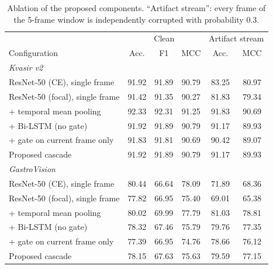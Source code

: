 \begin{table}[t]
\caption{Ablation of the proposed components. ``Artifact stream'': every frame of the 5-frame window is
independently corrupted with probability 0.3.}
\label{tab:ablation}\centering\setlength{\tabcolsep}{3pt}
\begin{tabular}{lccccc}\toprule
 & \multicolumn{3}{c}{Clean} & \multicolumn{2}{c}{Artifact stream}\\
Configuration & Acc. & F1 & MCC & Acc. & MCC\\\midrule
\multicolumn{6}{l}{\textit{Kvasir v2}}\\
\quad ResNet-50 (CE), single frame & 91.92 & 91.89 & 90.79 & 83.25 & 80.97\\
\quad ResNet-50 (focal), single frame & 91.42 & 91.35 & 90.27 & 81.83 & 79.34\\
\quad + temporal mean pooling & 92.33 & 92.31 & 91.25 & 91.83 & 90.69\\
\quad + Bi-LSTM (no gate) & 91.92 & 91.89 & 90.79 & 91.17 & 89.93\\
\quad + gate on current frame only & 91.83 & 91.81 & 90.69 & 90.42 & 89.07\\
\quad Proposed cascade & 91.92 & 91.89 & 90.79 & 91.17 & 89.93\\
\multicolumn{6}{l}{\textit{GastroVision}}\\
\quad ResNet-50 (CE), single frame & 80.44 & 66.64 & 78.09 & 71.89 & 68.36\\
\quad ResNet-50 (focal), single frame & 77.82 & 66.95 & 75.40 & 69.01 & 65.38\\
\quad + temporal mean pooling & 80.02 & 69.99 & 77.79 & 81.03 & 78.81\\
\quad + Bi-LSTM (no gate) & 78.32 & 67.46 & 75.79 & 79.76 & 77.35\\
\quad + gate on current frame only & 77.39 & 66.95 & 74.76 & 78.66 & 76.12\\
\quad Proposed cascade & 78.15 & 67.63 & 75.63 & 79.59 & 77.15\\
\bottomrule\end{tabular}\end{table}
